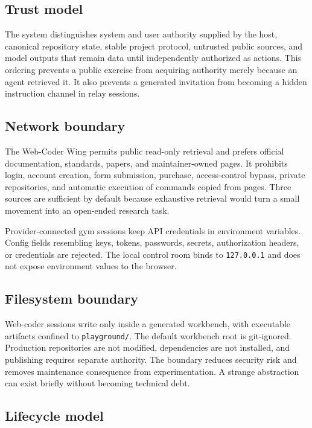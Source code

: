 \documentclass{arxiv-neurips-single}
\begin{document}
\subsection{Trust model}

The system distinguishes system and user authority supplied by the host, canonical repository state, stable project protocol, untrusted public sources, and model outputs that remain data until independently authorized as actions. This ordering prevents a public exercise from acquiring authority merely because an agent retrieved it. It also prevents a generated invitation from becoming a hidden instruction channel in relay sessions.

\subsection{Network boundary}

The Web-Coder Wing permits public read-only retrieval and prefers official documentation, standards, papers, and maintainer-owned pages. It prohibits login, account creation, form submission, purchase, access-control bypass, private repositories, and automatic execution of commands copied from pages. Three sources are sufficient by default because exhaustive retrieval would turn a small movement into an open-ended research task.

Provider-connected gym sessions keep API credentials in environment variables. Config fields resembling keys, tokens, passwords, secrets, authorization headers, or credentials are rejected. The local control room binds to \nolinkurl{127.0.0.1} and does not expose environment values to the browser.

\subsection{Filesystem boundary}

Web-coder sessions write only inside a generated workbench, with executable artifacts confined to \nolinkurl{playground/}. The default workbench root is git-ignored. Production repositories are not modified, dependencies are not installed, and publishing requires separate authority. The boundary reduces security risk and removes maintenance consequence from experimentation. A strange abstraction can exist briefly without becoming technical debt.

\subsection{Lifecycle model}
\end{document}
